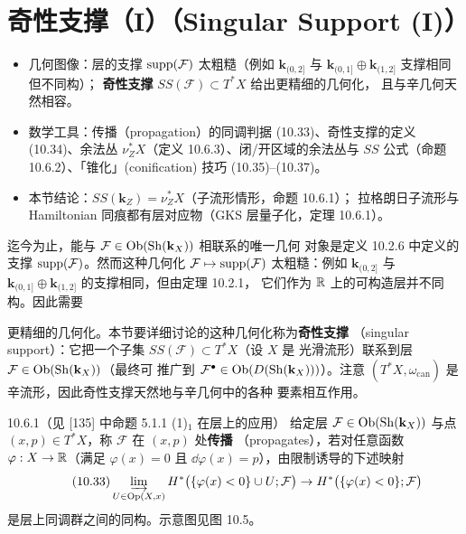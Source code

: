 \section{奇性支撑（I）（Singular Support (I)）}

\begin{keytakeaways}
\begin{itemize}
  \item 几何图像：层的支撑 $\operatorname{supp}(\mathcal F)$ 太粗糙（例如
        $\mathbf{k}_{(0,2]}$ 与
        $\mathbf{k}_{(0,1]}\oplus\mathbf{k}_{(1,2]}$ 支撑相同但不同构）；
        \textbf{奇性支撑} $SS(\mathcal F)\subset T^*X$ 给出更精细的几何化，
        且与辛几何天然相容。
  \item 数学工具：传播（propagation）的同调判据 (10.33)、奇性支撑的定义
        (10.34)、余法丛 $\nu^*_ZX$（定义 10.6.3）、闭/开区域的余法丛与
        $SS$ 公式（命题 10.6.2）、「锥化」(conification) 技巧 (10.35)–(10.37)。
  \item 本节结论：$SS(\mathbf{k}_Z)=\nu^*_ZX$（子流形情形，命题 10.6.1）；
        拉格朗日子流形与 Hamiltonian 同痕都有层对应物（GKS 层量子化，定理
        10.6.1）。
\end{itemize}
\end{keytakeaways}

迄今为止，能与 $\mathcal F\in\operatorname{Ob}(\operatorname{Sh}(\mathbf{k}_X))$ 相联系的唯一几何
对象是定义 10.2.6 中定义的支撑 $\operatorname{supp}(\mathcal F)$。然而这种几何化
$\mathcal F\mapsto\operatorname{supp}(\mathcal F)$ 太粗糙：例如
$\mathbf{k}_{(0,2]}$ 与
$\mathbf{k}_{(0,1]}\oplus\mathbf{k}_{(1,2]}$ 的支撑相同，但由定理 10.2.1，
它们作为 $\mathbb{R}$ 上的可构造层并不同构。因此需要

更精细的几何化。本节要详细讨论的这种几何化称为\textbf{奇性支撑}
（singular support）：它把一个子集 $SS(\mathcal F)\subset T^*X$（设 $X$ 是
光滑流形）联系到层 $\mathcal F\in\operatorname{Ob}(\operatorname{Sh}(\mathbf{k}_X))$（最终可
推广到 $\mathcal F^{\bullet}\in\operatorname{Ob}(D(\operatorname{Sh}(\mathbf{k}_X)))$）。注意
$(T^*X,\omega_{\mathrm{can}})$ 是辛流形，因此奇性支撑天然地与辛几何中的各种
要素相互作用。

\begin{wdefn}{10.6.1}（见 [135] 中命题 5.1.1 (1)$_1$ 在层上的应用）
给定层 $\mathcal F\in\operatorname{Ob}(\operatorname{Sh}(\mathbf{k}_X))$ 与点
$(x,p)\in T^*X$，称 $\mathcal F$ 在 $(x,p)$ 处\textbf{传播}
（propagates），若对任意函数 $\varphi:X\to\mathbb{R}$（满足 $\varphi(x)=0$ 且
$\dd\varphi(x)=p$），由限制诱导的下述映射
\begin{equation}\tag{10.33}
  \varinjlim_{U\in\operatorname{Op}(X,x)}H^*\bigl(\{\varphi(x)<0\}\cup U;\mathcal F\bigr)
  \to H^*\bigl(\{\varphi(x)<0\};\mathcal F\bigr)
\end{equation}
是层上同调群之间的同构。示意图见图 10.5。
\end{wdefn}

